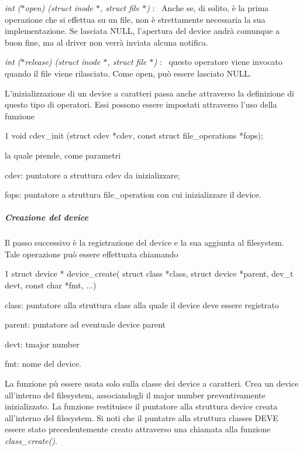 \begin{DoxyItemize}
\item {\itshape int ($\ast$open) (struct inode $\ast$, struct file $\ast$)} \+:~\newline
 Anche se, di solito, è la prima operazione che si effettua su un file, non è strettamente necessaria la sua implementazione. Se lasciata N\+U\+L\+L, l'apertura del device andrà comunque a buon fine, ma al driver non verrà inviata alcuna notifica.
\item {\itshape int ($\ast$release) (struct inode $\ast$, struct file $\ast$)} \+:~\newline
 questo operatore viene invocato quando il file viene rilasciato. Come open, può essere lasciato N\+U\+L\+L.
\end{DoxyItemize}

L'inizializzazione di un device a caratteri passa anche attraverso la definizione di questo tipo di operatori. Essi possono essere impostati attraverso l'uso della funzione 
\begin{DoxyCode}
1 void cdev\_init (struct cdev *cdev, const struct file\_operations *fops);
\end{DoxyCode}
 la quale prende, come parametri
\begin{DoxyItemize}
\item cdev\+: puntatore a struttura cdev da inizializzare;
\item fops\+: puntatore a struttura file\+\_\+operation con cui inizializzare il device.
\end{DoxyItemize}

\subparagraph*{Creazione del device}

Il passo successivo è la registrazione del device e la sua aggiunta al filesystem. Tale operazione può essere effettuata chiamando 
\begin{DoxyCode}
1 struct device * device\_create( struct class *class, struct device *parent, dev\_t devt, const char *fmt,
       ...)
\end{DoxyCode}

\begin{DoxyItemize}
\item class\+: puntatore alla struttura class alla quale il device deve essere registrato
\item parent\+: puntatore ad eventuale device parent
\item devt\+: tmajor number
\item fmt\+: nome del device.
\end{DoxyItemize}

La funzione pù essere usata solo sulla classe dei device a caratteri. Crea un device all'interno del filesystem, associandogli il major number preventivamente inizializzato. La funzione restituisce il puntatore alla struttura device creata all'interno del filesystem. Si noti che il puntatre alla struttura classes D\+E\+V\+E essere stato precedentemente creato attraverso una chiamata alla funzione {\itshape class\+\_\+create()}.

